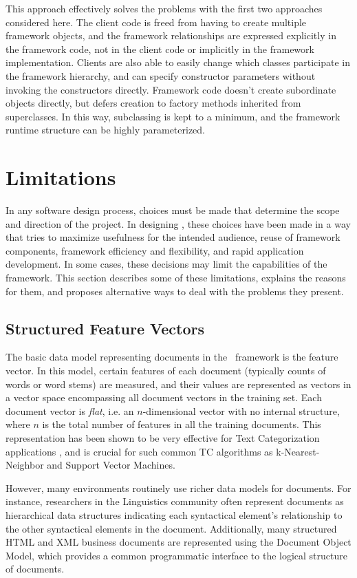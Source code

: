 This approach effectively solves the problems with the first two
approaches considered here.  The client code is freed from having to
create multiple framework objects, and the framework relationships are
expressed explicitly in the framework code, not in the client code or
implicitly in the framework implementation.  Clients are also able to
easily change which classes participate in the framework hierarchy,
and can specify constructor parameters without invoking the
constructors directly.  Framework code doesn't create subordinate
objects directly, but defers creation to factory methods inherited
from superclasses.  In this way, subclassing is kept to a minimum, and
the framework runtime structure can be highly parameterized.

\section{Limitations}

In any software design process, choices must be made that determine
the scope and direction of the project.  In designing \aicat, these
choices have been made in a way that tries to maximize usefulness for
the intended audience, reuse of framework components, framework
efficiency and flexibility, and rapid application development.  In
some cases, these decisions may limit the capabilities of the
framework.  This section describes some of these limitations, explains
the reasons for them, and proposes alternative ways to deal with the
problems they present.

\subsection{Structured Feature Vectors}

The basic data model representing documents in the \aicat\ framework
is the feature vector.  In this model, certain features of each
document (typically counts of words or word stems) are measured, and
their values are represented as vectors in a vector space encompassing
all document vectors in the training set.  Each document vector is
\emph{flat}, i.e. an $n$-dimensional vector with no internal
structure, where $n$ is the total number of features in all the
training documents.  This representation has been shown to be very
effective for Text Categorization applications
\cite[p. 10]{sebastiani:02}, and is crucial for such common TC
algorithms as k-Nearest-Neighbor and Support Vector Machines.

However, many environments routinely use richer data models for
documents.  For instance, researchers in the Linguistics community
often represent documents as hierarchical data structures indicating
each syntactical element's relationship to the other syntactical
elements in the document.\cite[ch. 11 \& 12]{manning:99} \cite{sag:99}
Additionally, many structured HTML and XML business documents are
represented using the Document Object Model, which provides a common
programmatic interface to the logical structure of
documents.\cite{dom}

